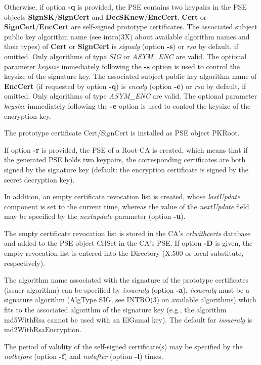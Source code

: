 Otherwise, if option {\bf -q} is provided, the PSE contains two keypairs 
in the PSE objects {\bf SignSK}/{\bf SignCert} and {\bf DecSKnew}/{\bf EncCert}. {\bf Cert} or 
{\bf SignCert}/{\bf EncCert} are self-signed prototype certificates.
The associated subject public key algorithm name (see intro(3X) about available 
algorithm names and their types) of {\bf Cert} or {\bf SignCert} is {\em signalg} (option {\bf -s}) or {\em rsa} 
by default, 
if omitted. Only algorithms of type {\em SIG} or {\em ASYM\_ENC} are valid. The optional
parameter {\em keysize} immediately following the {\bf -s} option is used to control
the keysize of the signature key.
The associated subject public key algorithm name of {\bf EncCert} (if requested by option {\bf -q})
is {\em encalg} (option {\bf -e}) or {\em rsa} by default, 
if omitted. Only algorithms of type {\em ASYM\_ENC} are valid. The optional
parameter {\em keysize} immediately following the {\bf -e} option is used to control
the keysize of the encryption key.

The prototype certificate Cert/SignCert is installed as PSE object PKRoot.

If option {\bf -r} is provided, the PSE of a Root-CA is created, which means that if the 
generated PSE holds two keypairs, the corresponding certificates are both signed by the signature key
(default: the encryption certificate is signed by the secret decryption key).

In addition, an empty certificate revocation list is created, whose {\em lastUpdate} component is set to the 
current time, whereas the value of the {\em nextUpdate} field may be specified by the {\em nextupdate} parameter (option {\bf -u}).

The empty certificate revocation list is stored in the CA's {\em crlwithcerts} database 
and added to the 
PSE object CrlSet in the CA's PSE.
If option {\bf -D} is given, the empty revocation list is entered into the Directory 
(X.500 or local substitute, respectively).

The algorithm name associated with the signature of the prototype certificates 
(issuer algorithm) can be specified by {\em issueralg} 
(option {\bf -a}). {\em issueralg} must be a
signature algorithm (AlgType SIG, see INTRO(3) on available algorithms) which fits to the associated 
algorithm of the signature key (e.g., the algorithm md5WithRsa cannot be used with an ElGamal key).
The default for {\em issueralg} is md2WithRsaEncryption.
 
The period of validity of the self-signed certificate(s) may be specified by the
{\em notbefore} (option {\bf -f}) and {\em notafter} (option {\bf -l}) times.

